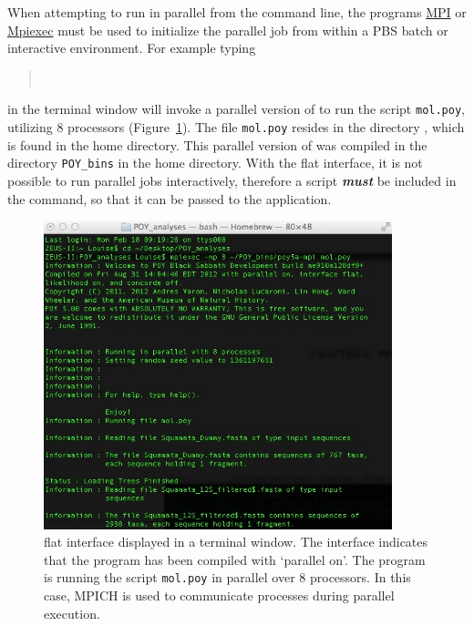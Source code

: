 When attempting to run \poy in parallel from the command line, the programs 
\href{http://www-unix.mcs.anl.gov/mpi/}{MPI} or \href {https://www.osc.edu/~djohnson/mpiexec/} 
{Mpiexec} must be used to initialize the parallel job from within a PBS batch 
or interactive environment.  For example typing

\begin{quote}
\\
\end{quote}
in the terminal window will invoke a parallel version of \poy to run the 
script \texttt{mol.poy}, utilizing 8 processors (Figure~\ref{fig:mpiexecscript}).  
The file \texttt{mol.poy} resides in the directory , 
which is found in the home directory.
This parallel version of \poy was compiled in the directory 
\texttt{POY\_bins} in the home directory.  With the flat interface, it is not 
possible to run parallel jobs interactively, therefore a script \textbf {\emph{must}} 
be included in the command, so that it can be passed to the application.  

\begin{figure}
\begin{center}
\includegraphics[width=0.9\textwidth]{doc/figures/mpiexec_script.jpg}
\end{center}
\caption{\poy flat interface displayed in a terminal window. The 
interface indicates that the program has been compiled with `parallel 
on'. The program is running the script \texttt{mol.poy} in parallel 
over 8 processors. In this case, MPICH is used to communicate 
processes during  parallel execution.}
\label{fig:mpiexecscript}
\end{figure}

